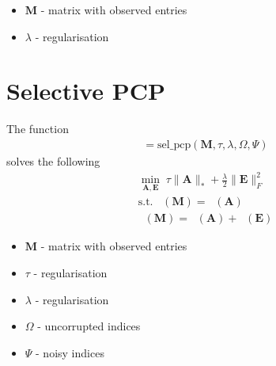 \documentclass{article}
\DeclareMathOperator*{\pro}{\mathcal P_{\Omega}}
\DeclareMathOperator*{\proa}{\mathcal P_{\Psi}}
\begin{document}
\begin{itemize}
\item $\mathbf M$ - matrix with observed entries
\item $\lambda$ - regularisation
\end{itemize}

\newpage
\section{Selective PCP}
\label{sel_pcp}

The function
\begin{align*}
[ \mathbf A ] = \text{sel\_pcp}( \mathbf M, \tau, \lambda, \Omega, \Psi )
\end{align*}
solves the following
\begin{align*}
\min_{\mathbf A, \mathbf E} \;  \tau \| \mathbf A \|_* + \frac{\lambda}{2} \| \mathbf E \|^2_F \\
\text{s.t.} \; \pro(\mathbf{M}) = \pro(\mathbf{A}) \nonumber \\
\proa(\mathbf{M}) = \proa(\mathbf{A}) + \proa(\mathbf E) \nonumber 
\end{align*}

\begin{itemize}
\item $\mathbf M$ - matrix with observed entries
\item $\tau$ - regularisation
\item $\lambda$ - regularisation
\item $\Omega$ - uncorrupted indices
\item $\Psi$ - noisy indices
\end{itemize}
\end{document}
